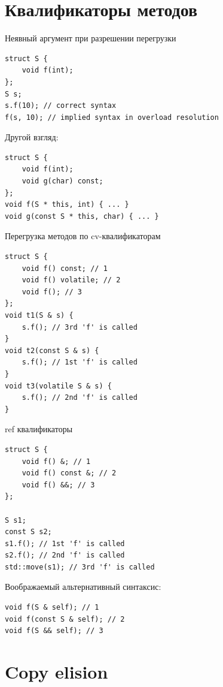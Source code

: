 \documentclass[unknownkeysallowed,xcolor=table]{beamer}
\begin{document}

\section{Квалификаторы методов}

\begin{frame}[fragile]{Неявный аргумент при разрешении перегрузки}
\begin{lstlisting}
struct S {
    void f(int);
};
S s;
s.f(10); // correct syntax
f(s, 10); // implied syntax in overload resolution
\end{lstlisting}
\vspace{1em}
Другой взгляд:
\begin{lstlisting}
struct S {
    void f(int);
    void g(char) const;
};
void f(S * this, int) { ... }
void g(const S * this, char) { ... }
\end{lstlisting}
\end{frame}

\begin{frame}[fragile]{Перегрузка методов по cv-квалификаторам}
\begin{lstlisting}
struct S {
    void f() const; // 1
    void f() volatile; // 2
    void f(); // 3
};
void t1(S & s) {
    s.f(); // 3rd 'f' is called
}
void t2(const S & s) {
    s.f(); // 1st 'f' is called
}
void t3(volatile S & s) {
    s.f(); // 2nd 'f' is called
}
\end{lstlisting}
\end{frame}

\begin{frame}[fragile]{ref квалификаторы}
\begin{lstlisting}
struct S {
    void f() &; // 1
    void f() const &; // 2
    void f() &&; // 3
};

S s1;
const S s2;
s1.f(); // 1st 'f' is called
s2.f(); // 2nd 'f' is called
std::move(s1); // 3rd 'f' is called
\end{lstlisting}
Воображаемый альтернативный синтаксис:
\begin{lstlisting}
void f(S & self); // 1
void f(const S & self); // 2
void f(S && self); // 3
\end{lstlisting}
\end{frame}


\section{Copy elision}
\end{document}

